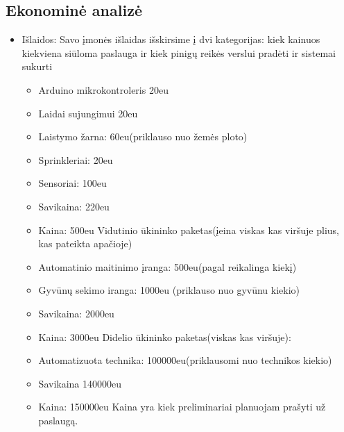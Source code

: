 \documentclass[oneside]{VUMIFPSkursinis}
\begin{document}
	\subsection{Ekonominė analizė}
	\begin{itemize}
		\item{Išlaidos: Savo įmonės išlaidas išskirsime į dvi kategorijas: kiek kainuos kiekviena siūloma paslauga ir kiek pinigų reikės verslui pradėti ir sistemai sukurti}
		\begin{itemize}
			Siūlomos paslaugos ir jų išlaidos:
			\newline
			Mažo ūkininko paketas
			\item{Arduino mikrokontroleris 20eu}
			\item{Laidai sujungimui 20eu}
			\item{Laistymo žarna: 60eu(priklauso nuo žemės ploto)}
			\item{Sprinkleriai: 20eu}
			\item{Sensoriai: 100eu}
			\item{Savikaina: 220eu}	
			\item{Kaina: 500eu}
			\newline
			Vidutinio ūkininko paketas(įeina viskas kas viršuje plius, kas pateikta apačioje)
			\item{Automatinio maitinimo įranga: 500eu(pagal reikalinga kiekį)}
			\item{Gyvūnų sekimo iranga: 1000eu (priklauso nuo gyvūnu kiekio)}
			\item{Savikaina: 2000eu}
			\item{Kaina: 3000eu}
			\newline
			Didelio ūkininko paketas(viskas kas viršuje):
			\item{Automatizuota technika: 100000eu(priklausomi nuo technikos kiekio)}
			\item{Savikaina 140000eu}
			\item{Kaina: 150000eu}
			\newline
			Kaina yra kiek preliminariai planuojam prašyti už paslaugą.
			

\end{itemize}
\end{itemize}
\end{document}
